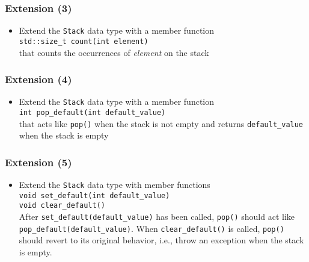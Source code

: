 \documentclass[10pt,aspectratio=169]{beamer}
\begin{document}
\begin{frame}[fragile]
  \frametitle{Extension (3)}  
  \begin{itemize}
  \item Extend the \texttt{Stack} data type with a member function\\[1ex]
    \verb!std::size_t count(int element)!\\[1ex]
    that counts the occurrences of \emph{element} on the stack
  \end{itemize}
\end{frame}

\begin{frame}[fragile]
	\frametitle{Extension (4)}  
	\begin{itemize}
	\item Extend the \texttt{Stack} data type with a member function\\[1ex]
	  \verb!int pop_default(int default_value)!\\[1ex]
	  that acts like \texttt{pop()} when the stack is not empty and
	  returns \verb!default_value! when the stack is empty
	\end{itemize}
  \end{frame}
  
  \begin{frame}[fragile]
	\frametitle{Extension (5)}  
	\begin{itemize}
	\item Extend the \texttt{Stack} data type with member functions\\[1ex]
	  \verb!void set_default(int default_value)!\\
	  \verb!void clear_default()!\\[1ex]
	  After \verb!set_default(default_value)! has been called, \texttt{pop()}
	  should act like \verb!pop_default(default_value)!. When
	  \verb!clear_default()! is called, \texttt{pop()} should revert to
	  its original behavior, i.e., throw an exception when the stack is
	  empty.
	\end{itemize}
  \end{frame}
  
\end{document}
